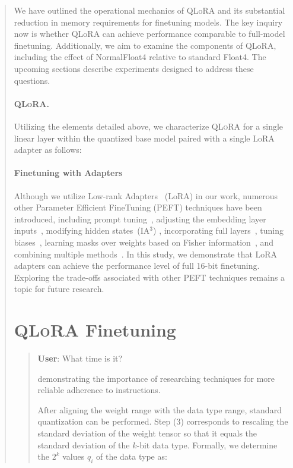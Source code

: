 \begin{quote}
We have outlined the operational mechanics of QLoRA and its substantial reduction in memory requirements for finetuning models. The key inquiry now is whether QLoRA can achieve performance comparable to full-model finetuning. Additionally, we aim to examine the components of QLoRA, including the effect of NormalFloat4 relative to standard Float4. The upcoming sections describe experiments designed to address these questions.

\paragraph{\textsc{QLoRA}.} Utilizing the elements detailed above, we characterize \textsc{QLoRA} for a single linear layer within the quantized base model paired with a single LoRA adapter as follows:

\paragraph{Finetuning with Adapters} Although we utilize Low-rank Adapters~\citep{hu2021lora} (LoRA) in our work, numerous other Parameter Efficient FineTuning (PEFT) techniques have been introduced, including prompt tuning~\citep{qin2021learning,lester2021power,li2021prefix}, adjusting the embedding layer inputs~\citep{an2022input}, modifying hidden states~(IA$^3$) \citep{liu2022few}, incorporating full layers~\citep{houlsby2019parameter}, tuning biases~\citep{zaken2021bitfit}, learning masks over weights based on Fisher information~\citep{sung2021training}, and combining multiple methods~\citep{henderson2021compacter}. In this study, we demonstrate that LoRA adapters can achieve the performance level of full 16-bit finetuning. Exploring the trade-offs associated with other PEFT techniques remains a topic for future research.

\section{\textsc{QLoRA} Finetuning}

\begin{quote}
    \textbf{User}: What time is it?

demonstrating the importance of researching techniques for more reliable adherence to instructions.

After aligning the weight range with the data type range, standard quantization can be performed. Step (3) corresponds to rescaling the standard deviation of the weight tensor so that it equals the standard deviation of the $k$-bit data type. Formally, we determine the $2^k$ values $q_i$ of the data type as:


\end{quote}
\end{quote}
